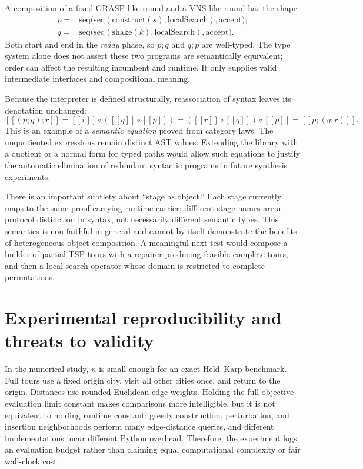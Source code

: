 \documentclass[11pt,a4paper]{article}
\newcommand{\den}[1]{\left[\!\left[ #1 \right]\!\right]}
\begin{document}
A composition of a fixed GRASP-like round and a VNS-like round has the
shape
\begin{align*}
 p={}&\mathrm{seq}\bigl(\mathrm{seq}(\mathrm{construct}(s),\mathrm{localSearch}),
        \mathrm{accept}\bigr);\\
 q={}&\mathrm{seq}\bigl(\mathrm{seq}(\mathrm{shake}(k),\mathrm{localSearch}),
        \mathrm{accept}\bigr).
\end{align*}
Both start and end in the \emph{ready} phase, so $p;q$ and $q;p$ are
well-typed. The type system alone does not assert these two programs are
semantically equivalent; order can affect the resulting incumbent and
runtime. It only supplies valid intermediate interfaces and compositional
meaning.

Because the interpreter is defined structurally, reassociation of syntax
leaves its denotation unchanged:
\[
 \den{(p;q);r}=\den{r}\circ(\den{q}\circ\den{p})
                   =(\den{r}\circ\den{q})\circ\den{p}
                   =\den{p;(q;r)}.
\]
This is an example of a \emph{semantic equation} proved from category laws.
The unquotiented expressions remain distinct AST values. Extending the
library with a quotient or a normal form for typed paths would allow such
equations to justify the automatic elimination of redundant syntactic
programs in future synthesis experiments.

There is an important subtlety about ``stage as object.'' Each stage
currently maps to the same proof-carrying runtime carrier; different stage
names are a protocol distinction in syntax, not necessarily different
semantic types. This semantics is non-faithful in general and cannot by
itself demonstrate the benefits of heterogeneous object composition.
A meaningful next test would compose a builder of partial TSP tours with
a repairer producing feasible complete tours, and then a local search
operator whose domain is restricted to complete permutations.

\section{Experimental reproducibility and threats to validity}

In the numerical study, $n$ is small enough for an exact Held--Karp
benchmark. Full tours use a fixed origin city, visit all other cities once,
and return to the origin. Distances use rounded Euclidean edge weights.
Holding the full-objective-evaluation limit constant makes comparisons
more intelligible, but it is not equivalent to holding runtime constant:
greedy construction, perturbation, and insertion neighborhoods perform
many edge-distance queries, and different implementations incur different
Python overhead. Therefore, the experiment logs an evaluation budget rather
than claiming equal computational complexity or fair wall-clock cost.
\end{document}
